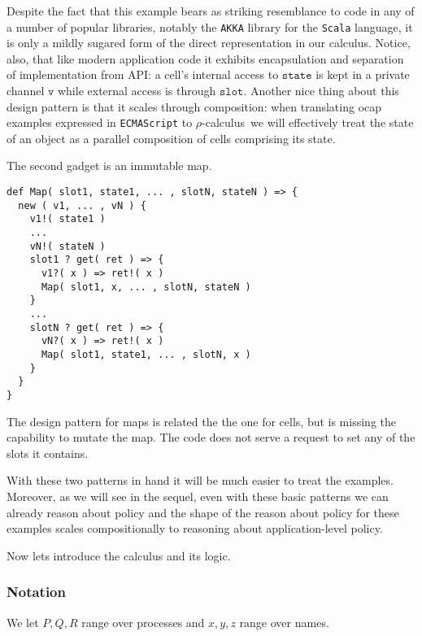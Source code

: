 \documentclass[]{amsart}
\theoremstyle{definition}
\theoremstyle{remark}
\numberwithin{equation}{subsection}
\newcommand{\rhoc}{$\rho$-calculus}
\begin{document}
Despite the fact that this example bears as striking resemblance to code
in any of a number of popular libraries, notably the \texttt{AKKA}
library for the \texttt{Scala} language, it is only a mildly sugared
form of the direct representation in our calculus. Notice, also, that
like modern application code it exhibits encapsulation and separation
of implementation from API: a cell's internal access to
$\texttt{state}$ is kept in a private channel $\texttt{v}$ while
external access is through $\texttt{slot}$. Another nice thing about
this design pattern is that it scales through composition: when
translating ocap examples expressed in \texttt{ECMAScript} to \rhoc\
we will effectively treat the state of an object as a parallel
composition of cells comprising its state.

The second gadget is an immutable map.

\begin{lstlisting}
def Map( slot1, state1, ... , slotN, stateN ) => {
  new ( v1, ... , vN ) {
    v1!( state1 )
    ...
    vN!( stateN )
    slot1 ? get( ret ) => { 
      v1?( x ) => ret!( x )
      Map( slot1, x, ... , slotN, stateN )
    }
    ...
    slotN ? get( ret ) => { 
      vN?( x ) => ret!( x )
      Map( slot1, state1, ... , slotN, x )
    }
  }
}
\end{lstlisting}

The design pattern for maps is related the the one for cells, but is
missing the capability to mutate the map. The code does not serve a
request to set any of the slots it contains.

With these two patterns in hand it will be much easier to treat the
examples. Moreover, as we will see in the sequel, even with these
basic patterns we can already reason about policy and the shape of the
reason about policy for these examples scales compositionally to
reasoning about application-level policy.

Now lets introduce the calculus and its logic.

\subsubsection{Notation}

We let ${P, Q, R}$ range over processes and ${x, y, z}$ range over names.
\end{document}
